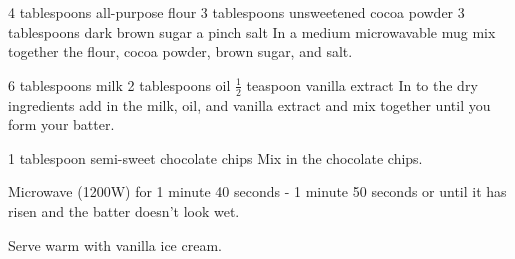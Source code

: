 
\begin{step}

4 tablespoons all-purpose flour
3 tablespoons unsweetened cocoa powder
3 tablespoons dark brown sugar
a pinch salt
\method
In a medium microwavable mug mix together the flour, cocoa powder, brown sugar, and salt.
\end{step}

\begin{step}
6 tablespoons milk
2 tablespoons oil
$\frac{1}{2}$ teaspoon vanilla extract
\method
In to the dry ingredients add in the milk, oil, and vanilla extract and mix together until you form your batter. 
\end{step}

\begin{step}
1 tablespoon semi-sweet chocolate chips
\method
Mix in the chocolate chips.

Microwave (1200W) for 1 minute 40 seconds - 1 minute 50 seconds or until it has risen and the batter doesn't look wet.

Serve warm with vanilla ice cream.
\end{step}